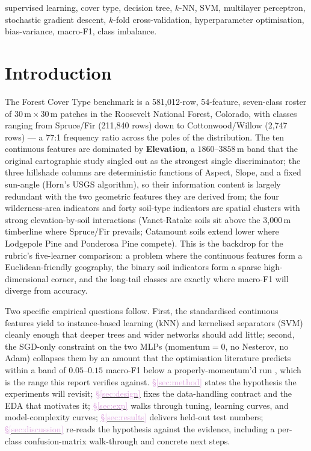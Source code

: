\documentclass[conference]{IEEEtran}
\newcommand{\secref}[1]{\hyperref[#1]{\textcolor{plum}{\S\ref*{#1}}}}
\begin{document}
\begin{IEEEkeywords}
supervised learning, cover type, decision tree, $k$-NN, SVM, multilayer
perceptron, stochastic gradient descent, $k$-fold cross-validation,
hyperparameter optimisation, bias-variance, macro-F1, class imbalance.
\end{IEEEkeywords}

\section{Introduction}\label{sec:intro}
The Forest Cover Type benchmark \cite{blackard1999} is a 581,012-row, 54-feature,
seven-class roster of $30\,\text{m}\times 30\,\text{m}$ patches in the Roosevelt
National Forest, Colorado, with classes ranging from Spruce/Fir (211{,}840 rows)
down to Cottonwood/Willow (2{,}747 rows) --- a 77:1 frequency ratio across the
poles of the distribution. The ten continuous features are dominated by
\textbf{Elevation}, a $1860$--$3858\,\text{m}$ band that the original cartographic
study \cite{blackard1999} singled out as the strongest single discriminator; the
three hillshade columns are deterministic functions of Aspect, Slope, and a
fixed sun-angle (Horn's USGS algorithm), so their information content is
largely redundant with the two geometric features they are derived from; the
four wilderness-area indicators and forty soil-type indicators are spatial
clusters with strong elevation-by-soil interactions (Vanet-Ratake soils sit
above the 3{,}000\,m timberline where Spruce/Fir prevails; Catamount soils
extend lower where Lodgepole Pine and Ponderosa Pine compete). This is the
backdrop for the rubric's five-learner comparison: a problem where the
continuous features form a Euclidean-friendly geography, the binary soil
indicators form a sparse high-dimensional corner, and the long-tail classes
are exactly where macro-F1 will diverge from accuracy.

Two specific empirical questions follow. First, the standardised continuous
features yield to instance-based learning (kNN) and kernelised separators
(SVM) cleanly enough that deeper trees and wider networks should add little;
second, the SGD-only constraint on the two MLPs ($\mathrm{momentum}{=}0$, no
Nesterov, no Adam) collapses them by an amount that the optimisation
literature predicts within a band of $0.05$--$0.15$ macro-F1 below a
properly-momentum'd run \cite{ruder2017overview,loshchilov2019adamw}, which is
the range this report verifies against. \secref{sec:method}
states the hypothesis the experiments will revisit; \secref{sec:design} fixes
the data-handling contract and the EDA that motivates it; \secref{sec:exp}
walks through tuning, learning curves, and model-complexity curves;
\secref{sec:results} delivers held-out test numbers; \secref{sec:discussion}
re-reads the hypothesis against the evidence, including a per-class
confusion-matrix walk-through and concrete next steps.
\end{document}

